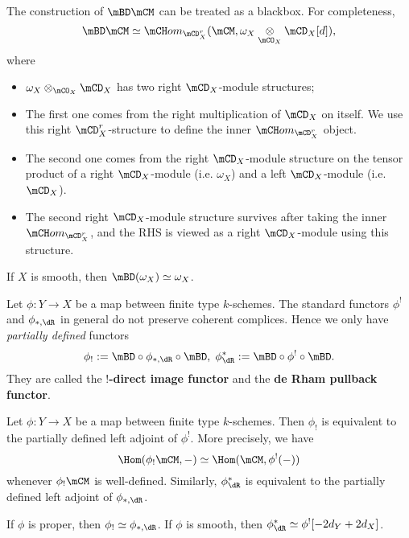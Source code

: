 	\begin{rem}
		The construction of $\mBD\mCM$ can be treated as a blackbox. For completeness,
		\[
			\mBD\mCM \simeq \mCH om_{\mCD_X^r}( \mCM, \omega_X\ot_{\mCO_X}\mCD_X[d] ),
		\]
		where
		\begin{itemize}
			\item 
				$\omega_X\ot_{\mCO_X}\mCD_X$ has two right $\mCD_X$-module structures;
			\item
				The first one comes from the right multiplication of $\mCD_X$ on itself. We use this right $\mCD_X^r$-structure to define the inner $\mCH om_{\mCD_X^r}$ object.
			\item
				The second one comes from the right $\mCD_X$-module structure on the tensor product of a right $\mCD_X$-module (i.e. $\omega_X$) and a left $\mCD_X$-module (i.e. $\mCD_X$).
			\item
				The second right $\mCD_X$-module structure survives after taking the inner $\mCH om_{\mCD_X^r}$, and the RHS is viewed as a right $\mCD_X$-module using this structure.
		\end{itemize}
		

	\end{rem}

	\begin{exam}
		If $X$ is smooth, then $\mBD(\omega_X) \simeq \omega_X$.
	\end{exam}
	
	\begin{constr}
		Let $\phi:Y \to X$ be a map between finite type $k$-schemes. The standard functors $\phi^!$ and $\phi_{*,\dR}$ in general do not preserve coherent complices. Hence we only have \emph{partially defined} functors
		\[
			\phi_!:= \mBD \circ \phi_{*,\dR}\circ \mBD,\; \phi_\dR^{*}:=\mBD \circ \phi^!\circ \mBD.
		\]
		They are called the \textbf{$!$-direct image functor} and the \textbf{de Rham pullback functor}.
	\end{constr}

	\begin{facts}
		Let $\phi:Y \to X$ be a map between finite type $k$-schemes. Then $\phi_!$ is equivalent to the partially defined left adjoint of $\phi^!$. More precisely, we have
		\[
			\Hom(\phi_!\mCM,-) \simeq \Hom( \mCM,\phi^!(-) )
		\]
		whenever $\phi_!\mCM$ is well-defined. Similarly, $\phi_\dR^*$ is equivalent to the partially defined left adjoint of $\phi_{*,\dR}$.
	\end{facts}

	\begin{rem}
		If $\phi$ is proper, then $\phi_!\simeq \phi_{*,\dR}$. If $\phi$ is smooth, then $\phi_\dR^* \simeq \phi^![-2d_Y + 2d_X]$.

	\end{rem}

